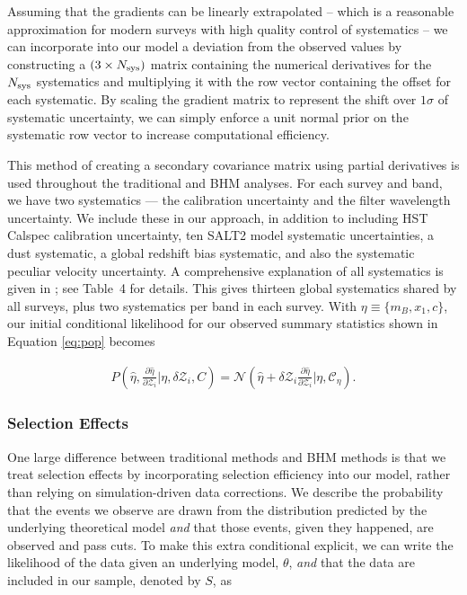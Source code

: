 \documentclass[a4paper,fleqn,usenatbib]{emulateapj}
\newcommand{\cov}{\mathcal{C}_\eta}
\newcommand{\Z}{\mathcal{Z}}
\begin{document}
Assuming that the gradients can be linearly extrapolated -- which is a reasonable approximation for modern surveys with high quality control of systematics -- we can incorporate into our model a deviation from the observed values by constructing a $(3 \times N_{\rm sys})$ matrix containing the numerical derivatives for the $N_{\rm sys}$ systematics and multiplying it with the row vector containing the offset for each systematic. By scaling the gradient matrix to represent the shift over $1\sigma$ of systematic uncertainty, we can simply enforce a unit normal prior on the systematic row vector to increase computational efficiency.

This method of creating a secondary covariance matrix using partial derivatives is used throughout the traditional and BHM analyses. For each survey and band, we have two systematics --- the calibration uncertainty and the filter wavelength uncertainty. We include these in our approach, in addition to including HST Calspec calibration uncertainty, ten SALT2 model systematic uncertainties, a dust systematic, a global redshift bias systematic, and also the systematic peculiar velocity uncertainty. A comprehensive explanation of all systematics is given in \citet{Brout18SYS}; see Table~4 for details. This gives thirteen global systematics shared by all surveys, plus two systematics per band in each survey. With $\eta \equiv \lbrace m_B, x_1, c \rbrace$, our initial conditional likelihood for our observed summary statistics shown in Equation \eqref{eq:pop} becomes

\begin{align}
P\left(\hat{\eta}, \frac{\partial \hat{\eta}}{\partial \Z_i} | \eta, \delta \Z_i, C\right) = \mathcal{N}\left(\hat{\eta} + \delta \Z_i \frac{\partial \hat{\eta}}{\partial \Z_i}|\eta,\cov\right). \label{eq:l3}
\end{align}




\subsubsection{Selection Effects}
\label{sec:selection}



One large difference between traditional methods and BHM methods is that we treat selection effects by incorporating selection efficiency into our model, rather than relying on simulation-driven data corrections. We describe the probability that the events we observe are drawn from the distribution predicted by the underlying theoretical model \textit{and} that those events, given they happened, are observed and pass cuts.  To make this extra conditional explicit, we can write the likelihood of the data given an underlying model, $\theta$, \textit{and} that the data are included in our sample, denoted by $S$, as
\end{document}
